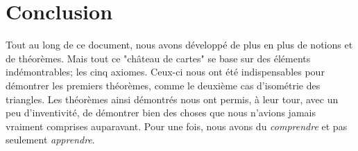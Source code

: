 \documentclass[a4paper,12pt]{article}
\begin{document}
\pagebreak
\section{Conclusion}
Tout au long de ce document, nous avons développé de plus en plus de notions et de théorèmes. Mais tout ce "château de cartes" se base sur des éléments indémontrables; les cinq axiomes. Ceux-ci nous ont été indispensables pour démontrer les premiers théorèmes, comme le deuxième cas d'isométrie des triangles. Les théorèmes ainsi démontrés  nous ont permis, à leur tour, avec un peu d'inventivité, de démontrer bien des choses que nous n'avions jamais vraiment comprises auparavant. Pour une fois, nous avons du \textit{comprendre} et pas seulement \textit{apprendre}.
\end{document}
